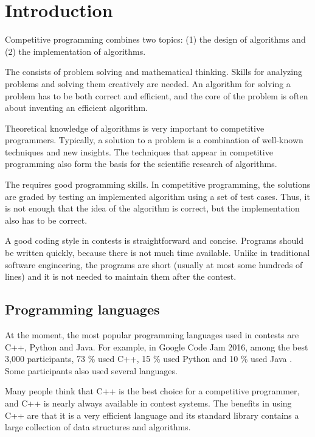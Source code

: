 \chapter{Introduction}

Competitive programming combines two topics:
(1) the design of algorithms and (2) the implementation of algorithms.

The  consists of problem solving
and mathematical thinking.
Skills for analyzing problems and solving them
creatively are needed.
An algorithm for solving a problem
has to be both correct and efficient,
and the core of the problem is often
about inventing an efficient algorithm.

Theoretical knowledge of algorithms
is very important to competitive programmers.
Typically, a solution to a problem is
a combination of well-known techniques and
new insights.
The techniques that appear in competitive programming
also form the basis for the scientific research
of algorithms.

The  requires good
programming skills.
In competitive programming, the solutions
are graded by testing an implemented algorithm
using a set of test cases.
Thus, it is not enough that the idea of the
algorithm is correct, but the implementation also
has to be correct.

A good coding style in contests is
straightforward and concise.
Programs should be written quickly,
because there is not much time available.
Unlike in traditional software engineering,
the programs are short (usually at most some
hundreds of lines) and it is not needed to 
maintain them after the contest.

\section{Programming languages}


At the moment, the most popular programming
languages used in contests are C++, Python and Java.
For example, in Google Code Jam 2016,
among the best 3,000 participants,
73 \% used C++,
15 \% used Python and
10 \% used Java \cite{goo16}.
Some participants also used several languages.

Many people think that C++ is the best choice
for a competitive programmer,
and C++ is nearly always available in
contest systems.
The benefits in using C++ are that
it is a very efficient language and
its standard library contains a 
large collection
of data structures and algorithms.

